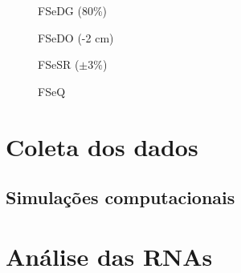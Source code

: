\label{cap:resultados}


\begin{figure}[htb]
\footnotesize
\centering

\vspace{1cm}
\caption{FSeDG (80\%)}
\label{fig:fsedg}
\end{figure}


\begin{figure}[htb]
\footnotesize
\centering

\vspace{1cm}
\caption{FSeDO (-2 cm)}
\label{fig:fsedg}
\end{figure}


\begin{figure}[htb]
\footnotesize
\centering

\vspace{1cm}
\caption{FSeSR ($\pm 3\%$)}
\label{fig:fsedg}
\end{figure}


\begin{figure}[htb]
\footnotesize
\centering

\vspace{1cm}
\caption{FSeQ}
\label{fig:fsedg}
\end{figure}

\section{Coleta dos dados}

\subsection{Simulações computacionais}


\section{Análise das RNAs}

